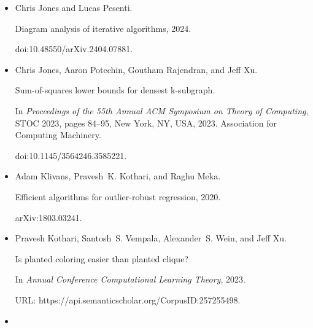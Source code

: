 \documentclass[10pt,a4paper]{article}
\begin{document}
\begin{itemize}
Sum-of-squares lower bounds for sparse independent set.


In \emph{2021 IEEE 62nd Annual Symposium on Foundations of Computer
Science (FOCS)}, pages 406–416, Los Alamitos, CA, USA, February 2022. IEEE
Computer Society.


doi:10.1109/FOCS52979.2021.00048.





\item[] 
[25]

Chris Jones and Lucas Pesenti.


Diagram analysis of iterative algorithms, 2024.


doi:10.48550/arXiv.2404.07881.





\item[] 
[26]

Chris Jones, Aaron Potechin, Goutham Rajendran, and Jeff Xu.


Sum-of-squares lower bounds for densest k-subgraph.


In \emph{Proceedings of the 55th Annual ACM Symposium on Theory of
Computing}, STOC 2023, pages 84–95, New York, NY, USA, 2023. Association for
Computing Machinery.


doi:10.1145/3564246.3585221.





\item[] 
[27]

Adam Klivans, Pravesh K. Kothari, and Raghu Meka.


Efficient algorithms for outlier-robust regression, 2020.


arXiv:1803.03241.





\item[] 
[28]

Pravesh Kothari, Santosh S. Vempala, Alexander S. Wein, and Jeff Xu.


Is planted coloring easier than planted clique?


In \emph{Annual Conference Computational Learning Theory}, 2023.


URL: https://api.semanticscholar.org/CorpusID:257255498.





\item[] 
[29]


\end{itemize}
\end{document}
